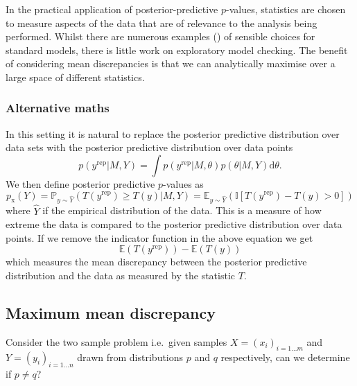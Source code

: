 \documentclass{article} %
\def\ie{i.e.\ }
\begin{document}
In the practical application of posterior-predictive $p$-values, statistics are chosen to measure aspects of the data that are of relevance to the analysis being performed.
Whilst there are numerous examples () of sensible choices for standard models, there is little work on exploratory model checking.
The benefit of considering mean discrepancies is that we can analytically maximise over a large space of different statistics.


\subsubsection{Alternative maths}

In this setting it is natural to replace the posterior predictive distribution over data sets with the posterior predictive distribution over data points
\begin{equation}
p(y^\textrm{rep}|M,Y) = \int p(y^\textrm{rep}|M,\theta)p(\theta|M,Y)\mathrm{d}\theta.
\end{equation}
We then define posterior predictive $p$-values as
\begin{equation}
  p_\textrm{x}(Y) = \mathbb{P}_{y\sim \hat{Y}}(T(y^\textrm{rep})\geq T(y)|M,Y) = \mathbb{E}_{y\sim \hat{Y}}(\mathbb{I}[T(y^\textrm{rep}) - T(y) > 0])
\end{equation}
where $\hat{Y}$ if the empirical distribution of the data.
This is a measure of how extreme the data is compared to the posterior predictive distribution over data points.
If we remove the indicator function in the above equation we get
\begin{equation}
  \mathbb{E}(T(y^\textrm{rep})) - \mathbb{E}(T(y))
\end{equation}
which measures the mean discrepancy between the posterior predictive distribution and the data as measured by the statistic $T$.

\subsection{Maximum mean discrepancy}

Consider the two sample problem \ie given samples $X = (x_i)_{i=1\ldots m}$ and $Y = (y_i)_{i=1\ldots n}$ drawn \iid from distributions $p$ and $q$ respectively, can we determine if $p \neq q$?
\end{document}
